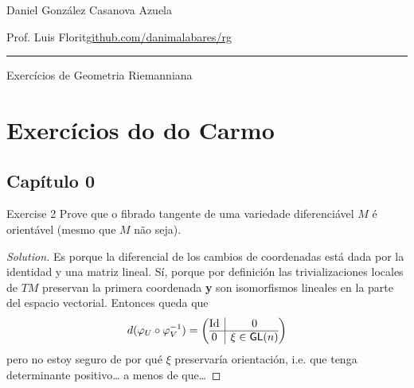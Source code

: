 
\newcommand{\rightlooparrow}{\mathbin{
    \vbox{\openup-10.25pt\halign{\hss$##$\hss\cr\circ\cr\longrightarrow\cr}}
}}



\begin{minipage}{\textwidth}
	\begin{minipage}{1\textwidth}
		\hfill Daniel González Casanova Azuela
		
		{\small Prof. Luis Florit\hfill\href{https://github.com/danimalabares/rg}{github.com/danimalabares/rg}}
	\end{minipage}
\end{minipage}\vspace{.2cm}\hrule

\vspace{10pt}
{\huge Exercícios de Geometria Riemanniana}
\tableofcontents

\section{Exercícios do do Carmo}

\subsection{Capítulo 0}
\begin{thing4}{Exercise 2}\label{exer:2}\leavevmode
Prove que o fibrado tangente de uma variedade diferenciável \(M\) é orientável (mesmo que \(M\) não seja).
\end{thing4}

\begin{proof}[Solution]\leavevmode
Es porque la diferencial de los cambios de coordenadas está dada por la identidad y una matriz lineal. Sí, porque por definición las trivializaciones locales de \(TM\) preservan la primera coordenada \textbf{y} son isomorfismos lineales en la parte del espacio vectorial. Entonces queda que 
\[d(\varphi_U \circ \varphi_V^{-1})=\left(\begin{array}{@{}c|c@{}}
\operatorname{Id}&0\\
\hline
0&\xi \in \mathsf{GL}(n)\end{array}\right)\]
pero no estoy seguro de por qué \(\xi\) preservaría orientación, i.e. que tenga determinante positivo… a menos de que… 
\end{proof}

